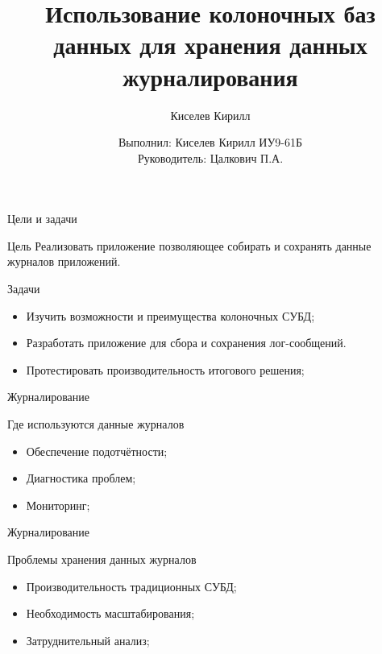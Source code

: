 \documentclass{beamer}
\title{Использование колоночных баз данных для хранения данных журналирования}
\author{Киселев Кирилл}
\author[me]{Выполнил: Киселев Кирилл ИУ9-61Б\\[1mm]Руководитель: Цалкович П.А.}
\begin{document}
\maketitle

\begin{frame}{Цели и задачи}
	\begin{alertblock}{Цель}
		Реализовать приложение позволяющее собирать и сохранять данные журналов приложений.
	\end{alertblock}
	\begin{alertblock}{Задачи}
		\begin{itemize}
			\item Изучить возможности и преимущества колоночных СУБД;
			\item Разработать приложение для сбора и сохранения лог-сообщений.
			\item Протестировать производительность итогового решения;
		\end{itemize}
	\end{alertblock}
\end{frame}


\begin{frame}{Журналирование}
  \begin{alertblock}{Где используются данные журналов}
	\begin{itemize}
		\item Обеспечение подотчётности;
		\item Диагностика проблем;
		\item Мониторинг;
	\end{itemize}
  \end{alertblock}
\end{frame}


\begin{frame}{Журналирование}
  \begin{alertblock}{Проблемы хранения данных журналов}
	\begin{itemize}
    \item Производительность традиционных СУБД;
    \item Необходимость масштабирования;
    \item Затруднительный анализ;
	\end{itemize}
  \end{alertblock}
\end{frame}
\end{document}
